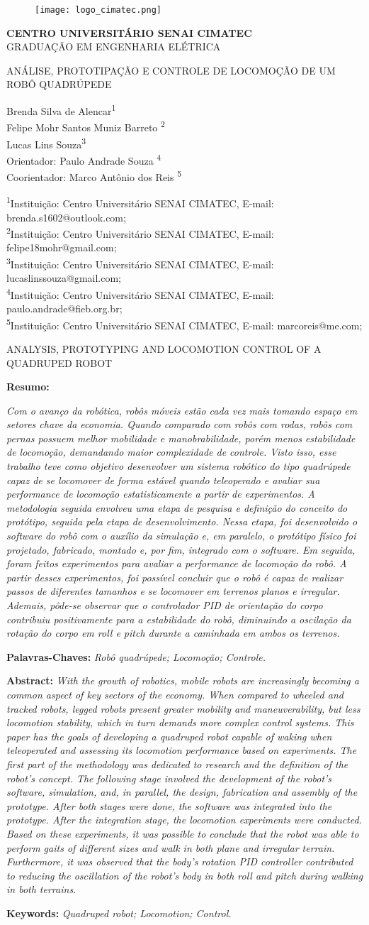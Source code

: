 \documentclass[../main.tex]{subfiles}
\makeatletter
\renewcommand\maketitle{
    \begin{figure}[t]
        \centering
        \texttt{[image: logo\_cimatec.png]}
    \end{figure}
    
    \begin{center}
        \textbf{\MakeUppercase{Centro Universitário Senai Cimatec}}
        \\
        \MakeUppercase{Graduação em Engenharia Elétrica}
        
        \vspace{\baselineskip}
        
        \begin{large}
          \MakeUppercase{Análise, prototipação e controle de locomoção de um robô quadrúpede}
        \end{large}
    \end{center}

    \begin{flushright}
        Brenda Silva de Alencar\textsuperscript{1}\\
        Felipe Mohr Santos Muniz Barreto \textsuperscript{2}\\
        Lucas Lins Souza\textsuperscript{3}\\
        Orientador: Paulo Andrade Souza \textsuperscript{4}\\
        Coorientador: Marco Antônio dos Reis \textsuperscript{5}\\
    \end{flushright}
    \begin{flushleft}
      \begin{small}
          \textsuperscript{1}Instituição: Centro Universitário SENAI CIMATEC, E-mail: brenda.s1602@outlook.com;\\
          \textsuperscript{2}Instituição: Centro Universitário SENAI CIMATEC, E-mail: felipe18mohr@gmail.com;\\
          \textsuperscript{3}Instituição: Centro Universitário SENAI CIMATEC, E-mail: lucaslinssouza@gmail.com;\\
          \textsuperscript{4}Instituição: Centro Universitário SENAI CIMATEC, E-mail: paulo.andrade@fieb.org.br;\\
          \textsuperscript{5}Instituição: Centro Universitário SENAI CIMATEC, E-mail: marcoreis@me.com;\\      
        \end{small}
      \end{flushleft}

      \begin{center}
        \begin{large}
          \MakeUppercase{Analysis, prototyping and locomotion control of a quadruped robot}
        \end{large}
      \end{center}
    
    \noindent\textbf{Resumo:} 

    \textit{Com o avanço da robótica, robôs móveis estão cada vez mais tomando espaço em setores chave da economia. Quando comparado com robôs com rodas, robôs com pernas possuem melhor mobilidade e manobrabilidade, porém menos estabilidade de locomoção, demandando maior complexidade de controle.  Visto isso, esse trabalho teve como objetivo desenvolver um sistema robótico do tipo quadrúpede capaz de se locomover de forma estável quando teleoperado e avaliar sua performance de locomoção estatisticamente a partir de experimentos. A metodologia seguida envolveu uma etapa de pesquisa e definição do conceito do protótipo, seguida pela etapa de desenvolvimento. Nessa etapa, foi desenvolvido o software do robô com o auxílio da simulação e, em paralelo, o protótipo físico foi projetado, fabricado, montado e, por fim, integrado com o software. Em seguida, foram feitos experimentos para avaliar a performance de locomoção do robô. A partir desses experimentos, foi possível concluir que o robô é capaz de realizar passos de diferentes tamanhos e se locomover em terrenos planos e irregular. Ademais, pôde-se observar que o controlador PID de orientação do corpo contribuiu positivamente para a estabilidade do robô, diminuindo a oscilação da rotação do corpo em roll e pitch durante a caminhada em ambos os terrenos.}
    
    \noindent\textbf{Palavras-Chaves:} 
    \textit{Robô quadrúpede; Locomoção; Controle.}
    
    \vspace{\baselineskip}
    \vspace{\baselineskip}
    \vspace{\baselineskip}
    \vspace{\baselineskip}
    \vspace{\baselineskip}
    \vspace{\baselineskip}
    
    \noindent\textbf{Abstract:} 
    \textit{With the growth of robotics, mobile robots are increasingly becoming a common aspect of key sectors of the economy. When compared to wheeled and tracked robots, legged robots present greater mobility and maneuverability, but less locomotion stability, which in turn demands more complex control systems. This paper has the goals of developing a quadruped robot capable of waking when teleoperated and assessing its locomotion performance based on experiments. The first part of the methodology was dedicated to research and the definition of the robot's concept. The following stage involved the development of the robot's software, simulation, and, in parallel, the design, fabrication and assembly of the prototype. After both stages were done, the software was integrated into the prototype. After the integration stage, the locomotion experiments were conducted. Based on these experiments, it was possible to conclude that the robot was able to perform gaits of different sizes and walk in both plane and irregular terrain. Furthermore, it was observed that the body's rotation PID controller contributed to reducing the oscillation of the robot's body in both roll and pitch during walking in both terrains.}
    
    \noindent\textbf{Keywords:} 
      \textit{Quadruped robot; Locomotion; Control.}
    
}
\makeatother
\begin{document}
\onecolumn
\maketitle
\newpage
\twocolumn
\end{document}
